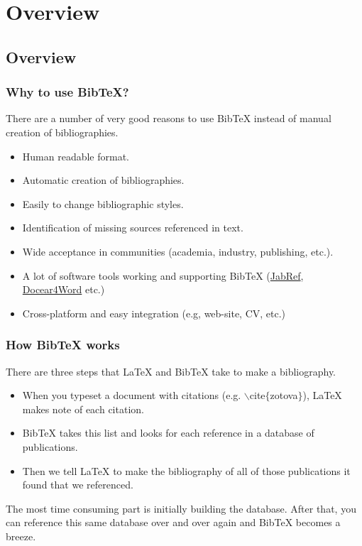 
\section[Overview]{Overview}
\subsection[Overview]{Overview}

\begin{frame}  \frametitle{Why to use BibTeX?}
	There are a number of very good reasons to use BibTeX instead of manual creation of bibliographies.
	\begin{itemize}
		\item Human readable format.
		\item Automatic creation of bibliographies.
		\item Easily to change bibliographic styles.
		\item Identification of missing sources referenced in text.
		\item Wide acceptance in communities (academia, industry, publishing, etc.).
		\item A lot of software tools working and supporting BibTeX (\href{http://jabref.sourceforge.net/}{JabRef}, \href{http://www.docear.org/software/add-ons/docear4word/overview/}{Docear4Word} etc.)
		\item Cross-platform and easy integration (e.g, web-site, CV, etc.)			
	\end{itemize}
\end{frame}

\begin{frame}  \frametitle{How BibTeX works}
	There are three steps that LaTeX and BibTeX take to make a bibliography.
	\begin{itemize}
		\item When you typeset a document with citations (e.g. {\color{command}$\backslash$cite{\color{braces}$\{$}{\color{black}zotova}{\color{braces}$\}$}}), LaTeX makes note of each citation.
		\item BibTeX takes this list and looks for each reference in a database of publications.
		\item Then we tell LaTeX to make the bibliography of all of those publications it found that we referenced.
	\end{itemize}
	The most time consuming part is initially building the database. After that, you can reference this same database over and over again and BibTeX becomes a breeze.
\end{frame}

